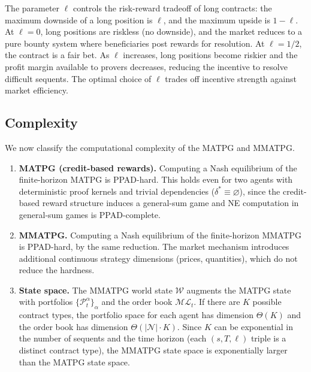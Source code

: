\begin{remark}
The parameter $\ell$ controls the risk-reward tradeoff of long contracts: the maximum downside of a long position is $\ell$, and the maximum upside is $1-\ell$. At $\ell = 0$, long positions are riskless (no downside), and the market reduces to a pure bounty system where beneficiaries post rewards for resolution. At $\ell = 1/2$, the contract is a fair bet. As $\ell$ increases, long positions become riskier and the profit margin available to provers decreases, reducing the incentive to resolve difficult sequents. The optimal choice of $\ell$ trades off incentive strength against market efficiency.
\end{remark}


\subsection{Complexity}\label{sec:game-complexity}

We now classify the computational complexity of the MATPG and MMATPG.

\begin{theorem}\label{thm:game-complexity}
\leavevmode
\begin{enumerate}
    \item \textbf{MATPG (credit-based rewards).} Computing a Nash equilibrium of the finite-horizon MATPG is PPAD-hard. This holds even for two agents with deterministic proof kernels and trivial dependencies ($\delta^*\equiv\varnothing$), since the credit-based reward structure induces a general-sum game and NE computation in general-sum games is PPAD-complete.
    
    \item \textbf{MMATPG.} Computing a Nash equilibrium of the finite-horizon MMATPG is PPAD-hard, by the same reduction. The market mechanism introduces additional continuous strategy dimensions (prices, quantities), which do not reduce the hardness.
    
    \item \textbf{State space.} The MMATPG world state $\mathcal{W}$ augments the MATPG state with portfolios $\{\mathcal{P}^\alpha_t\}_\alpha$ and the order book $\mathcal{ML}_t$. If there are $K$ possible contract types, the portfolio space for each agent has dimension $\Theta(K)$ and the order book has dimension $\Theta(|\mathcal{N}|\cdot K)$. Since $K$ can be exponential in the number of sequents and the time horizon (each $(s,T,\ell)$ triple is a distinct contract type), the MMATPG state space is exponentially larger than the MATPG state space.
 
\end{enumerate}
\end{theorem}

